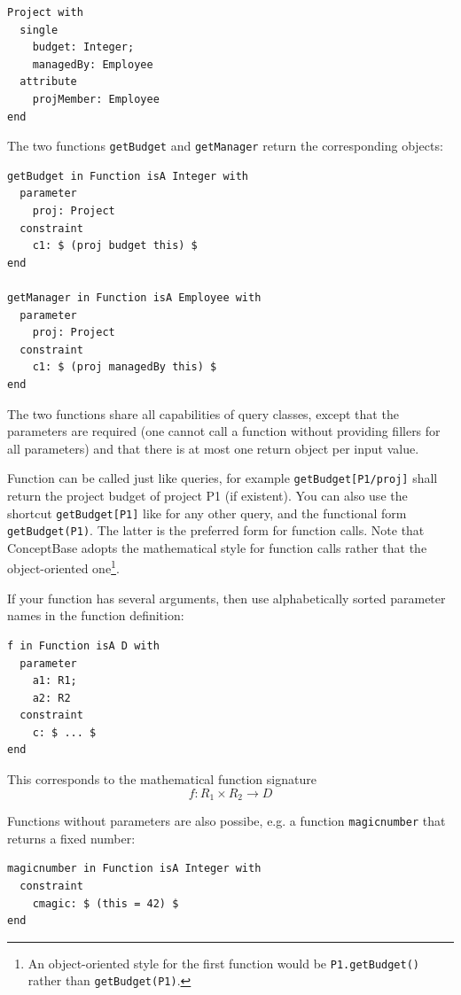 \begin{verbatim}
Project with
  single
    budget: Integer;
    managedBy: Employee
  attribute
    projMember: Employee
end
\end{verbatim}

The two functions {\tt getBudget} and {\tt getManager} return the corresponding objects:

\begin{verbatim}
getBudget in Function isA Integer with
  parameter
    proj: Project
  constraint
    c1: $ (proj budget this) $
end

getManager in Function isA Employee with
  parameter
    proj: Project
  constraint
    c1: $ (proj managedBy this) $
end
\end{verbatim}

The two functions share all capabilities of query classes, except that the parameters are required
(one cannot call a function without providing fillers for all parameters) and that there is at most
one return object per input value.

Function can be called just like queries, for example {\tt getBudget[P1/proj]} shall return
the project budget of project P1 (if existent). You can also use the shortcut {\tt getBudget[P1]}
like for any other query, and the functional form {\tt getBudget(P1)}. The latter is the preferred
form for function calls. Note that ConceptBase adopts the mathematical style for function calls rather
that the object-oriented one\footnote{An object-oriented style for the first function would be
{\tt P1.getBudget()} rather than {\tt getBudget(P1)}.}.

If your function has several arguments, then use alphabetically sorted 
parameter names in the function definition:

\begin{verbatim}
f in Function isA D with
  parameter
    a1: R1;
    a2: R2
  constraint
    c: $ ... $
end
\end{verbatim}

This corresponds to the mathematical function signature
$$
f: R_1 \times R_2 \rightarrow D
$$

\noindent
Functions without parameters are also possibe, e.g. a function {\tt magicnumber} that returns 
a fixed number:

\begin{verbatim}
magicnumber in Function isA Integer with
  constraint
    cmagic: $ (this = 42) $
end
\end{verbatim}

